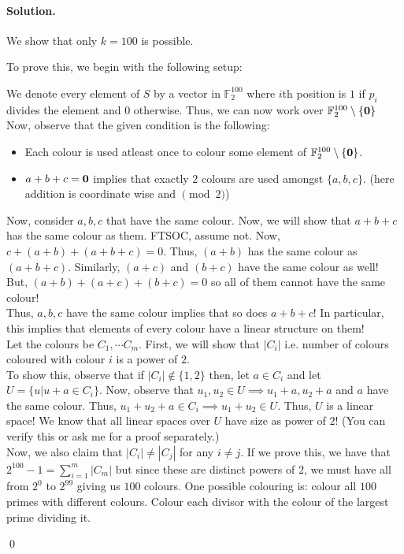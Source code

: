 \documentclass[12pt]{article}
\newenvironment{solution}
{\paragraph{Solution.}}
{\qed\eject}
\newcommand*{\FF}{\mathbb{F}}
\begin{document}
\begin{solution}
    We show that only $k=100$ is possible.

    To prove this, we begin with the following setup:

    We denote every element of $S$ by a vector in $\FF_2^{100}$ where $i$th position is $1$ if $p_i$ divides the element and $0$ otherwise. Thus, we can now work over $\FF_2^{100}\setminus \{{\bf 0}\}$\\

    Now, observe that the given condition is the following:

    \begin{itemize}
        \item Each colour is used atleast once to colour some element of $\FF_2^{100}\setminus \{{\bf 0}\}$.
        \item $a+b+c={\bf 0}$ implies that exactly $2$ colours are used amongst $\{a,b,c\}$. (here addition is coordinate wise and $\pmod 2$)
    \end{itemize}
    Now, consider $a,b,c$ that have the same colour. Now, we will show that $a+b+c$ has the same colour as them. FTSOC, assume not. Now, $c+(a+b)+(a+b+c)=0$. Thus, $(a+b)$ has the same colour as $(a+b+c)$. Similarly, $(a+c)$ and $(b+c)$ have the same colour as well!
    But, $(a+b)+(a+c)+(b+c)=0$ so all of them cannot have the same colour!\\
    
    Thus, $a,b,c$ have the same colour implies that so does $a+b+c$! In particular, this implies that elements of every colour have a linear structure on them!\\

    Let the colours be $C_1,\cdots C_m$. First, we will show that $|C_i|$ i.e. number of colours coloured with colour $i$ is a power of $2$.\\

    To show this, observe that if $|C_i|\not\in \{1,2\}$ then, let $a\in C_i$ and let $U=\{u|u+a\in C_i\}$. Now, observe that $u_1,u_2\in U\implies u_1+a, u_2+a$ and $a$ have the same colour. Thus, $u_1+u_2+a\in C_i\implies u_1+u_2\in U$. Thus, $U$ is a linear space! We know that all linear spaces over $U$ have size as power of $2$! (You can verify this or ask me for a proof separately.)\\

    Now, we also claim that $|C_i|\ne |C_j|$ for any $i\ne j$. If we prove this, we have that $2^{100}-1=\sum_{i=1}^{m}|C_m|$ but since these are distinct powers of $2$, we must have all from $2^0$ to $2^99$ giving us $100$ colours. One possible colouring is: colour all $100$ primes with different colours. Colour each divisor with the colour of the largest prime dividing it.


\end{solution}
\end{document}
